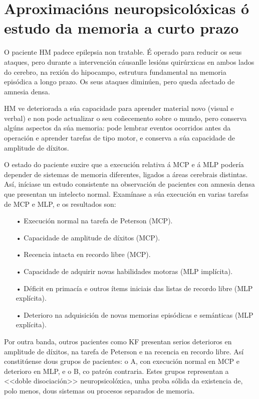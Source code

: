 \documentclass[a4paper,11pt]{article}
\begin{document}
\section{Aproximacións neuropsicolóxicas ó estudo da memoria a curto prazo}
O paciente HM padece epilepsia non tratable. É operado para reducir os seus ataques, pero durante a intervención cáusanlle lesións quirúrxicas en ambos lados do cerebro, na rexión do hipocampo, estrutura fundamental na memoria episódica a longo prazo. Os seus ataques diminúen, pero queda afectado de amnesia densa. 

HM ve deteriorada a súa capacidade para aprender material novo (visual e verbal) e non pode actualizar o seu coñecemento sobre o mundo, pero conserva algúns aspectos da súa memoria: pode lembrar eventos ocorridos antes da operación e aprender tarefas de tipo motor, e conserva a súa capacidade de amplitude de díxitos.

O estado do paciente suxire que a execución relativa á MCP e á MLP podería depender de sistemas de memoria diferentes, ligados a áreas cerebrais distintas. Así, iníciase un estudo consistente na observación de pacientes con amnesia densa que presentan un intelecto normal. Examínase a súa execución en varias tarefas de MCP e MLP, e os resultados son:
\begin{itemize}
	\item[•] Execución normal na tarefa de Peterson (MCP).
	\item[•] Capacidade de amplitude de díxitos (MCP).
	\item[•] Recencia intacta en recordo libre (MCP).
	\item[•] Capacidade de adquirir novas habilidades motoras (MLP implícita).
	\item[•] Déficit en primacía e outros ítems iniciais das listas de recordo libre (MLP explícita). 
	\item[•] Deterioro na adquisición de novas memorias episódicas e semánticas (MLP explícita).
\end{itemize} 

Por outra banda, outros pacientes como KF presentan serios deterioros en amplitude de díxitos, na tarefa de Peterson e na recencia en recordo libre. Así constitúense dous grupos de pacientes: o A, con execución normal en MCP e deterioro en MLP, e o B, co patrón contraria. Estes grupos representan a <<doble disociación>> neuropsicolóxica, unha proba sólida da existencia de, polo menos, dous sistemas ou procesos separados de memoria. 
\end{document}
